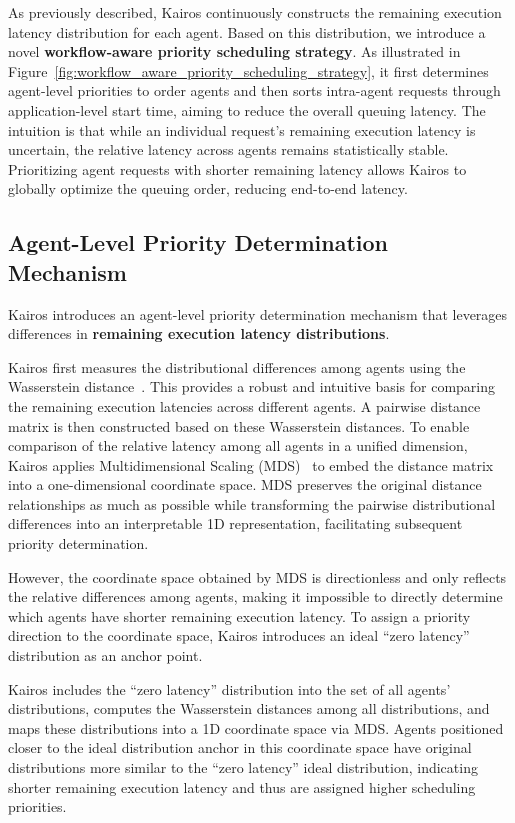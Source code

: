 \documentclass[sigplan,nonacm]{acmart}
\newcommand{\system}{Kairos}
\begin{document}
\label{sec:Scheduling}
As previously described, \system{} continuously constructs the remaining execution latency distribution for each agent. Based on this distribution, we introduce a novel \textbf{workflow-aware priority scheduling strategy}. As illustrated in Figure~\ref{fig:workflow_aware_priority_scheduling_strategy}, it first determines agent-level priorities to order agents and then sorts intra-agent requests through application-level start time, aiming to reduce the overall queuing latency.
The intuition is that while an individual request's remaining execution latency is uncertain, the relative latency across agents remains statistically stable. Prioritizing agent requests with shorter remaining latency allows \system{} to globally optimize the queuing order, reducing end-to-end latency.

\subsection{Agent-Level Priority Determination Mechanism}
\label{sec:agent-level_mechanism}
\system{} introduces an agent-level priority determination mechanism that leverages differences in \textbf{remaining execution latency distributions}.

\system{} first measures the distributional differences among agents using the Wasserstein distance~\cite{wasserstein}. This provides a robust and intuitive basis for comparing the remaining execution latencies across different agents. A pairwise distance matrix is then constructed based on these Wasserstein distances. To enable comparison of the relative latency among all agents in a unified dimension, \system{} applies Multidimensional Scaling (MDS)~\cite{mds} to embed the distance matrix into a one-dimensional coordinate space. MDS preserves the original distance relationships as much as possible while transforming the pairwise distributional differences into an interpretable 1D representation, facilitating subsequent priority determination.

However, the coordinate space obtained by MDS is directionless and only reflects the relative differences among agents, making it impossible to directly determine which agents have shorter remaining execution latency. To assign a priority direction to the coordinate space, \system{} introduces an ideal “zero latency” distribution as an anchor point.

\system{} includes the “zero latency” distribution into the set of all agents' distributions, computes the Wasserstein distances among all distributions, and maps these distributions into a 1D coordinate space via MDS. Agents positioned closer to the ideal distribution anchor in this coordinate space have original distributions more similar to the “zero latency” ideal distribution, indicating shorter remaining execution latency and thus are assigned higher scheduling priorities.
\end{document}
